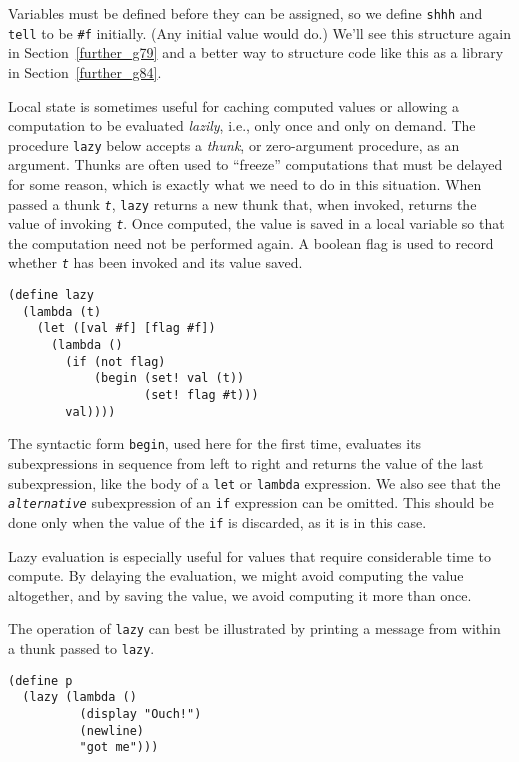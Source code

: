 Variables must be defined
before they can be assigned, so we define 
\texttt{shhh} and \texttt{tell} to be
\texttt{\#{}f} initially.
(Any initial value would do.)
We'll see this structure again in Section \ref{further_g79}
and a better way to structure code like this as a library in
Section \ref{further_g84}.


\label{start_s171}Local state is sometimes useful for caching
computed values or allowing a computation to be
evaluated \textit{lazily}, i.e., only once and only on demand.
The procedure \label{start_s172}\texttt{lazy} below accepts a
\label{start_s173}\textit{thunk}, or
zero-argument procedure, as an argument.
Thunks are often used to ``freeze'' computations that must be
delayed for some reason, which is exactly what we need to do in
this situation.
When passed a thunk \texttt{\textit{t}}, \texttt{lazy} returns a new thunk that, when
invoked, returns the value of invoking \texttt{\textit{t}}.
Once computed, the value is saved in a local variable so that the
computation need not be performed again.
A boolean flag is used to record whether \texttt{\textit{t}} has been
invoked and its value saved.


\begin{alltt}
(define lazy
  (lambda (t)
    (let ([val \#{}f] [flag \#{}f])
      (lambda ()
        (if (not flag)
            (begin (set! val (t))
                   (set! flag \#{}t)))
        val))))
\end{alltt}


The syntactic form \label{start_s174}\texttt{begin}, used here for the first time, evaluates
its subexpressions in sequence from left to right and returns the value
of the last subexpression,
like the body of a \texttt{let} or \texttt{lambda} expression.
We also see that the \texttt{\textit{alternative}} subexpression of an \label{start_s175}\texttt{if}
expression can be omitted.
This should be done only when the value of the \texttt{if} is discarded, as
it is in this case.


Lazy evaluation is especially useful for values that require
considerable time to compute.
By delaying the evaluation, we might avoid computing the value
altogether, and by saving the value, we avoid computing it
more than once.


The operation of \texttt{lazy} can best be illustrated by printing a
message from within a thunk passed to \texttt{lazy}.


\begin{alltt}
(define p
  (lazy (lambda ()
          (display "Ouch!")
          (newline)
          "got me")))
\end{alltt}


